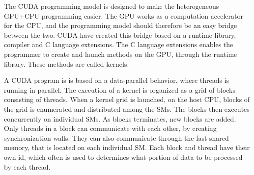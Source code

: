 The CUDA programming model is designed to make the heterogeneous GPU+CPU programming easier. The GPU works as a computation accelerator for the CPU, and the programming model should therefore be an easy bridge between the two. CUDA have created this bridge based on a runtime library, compiler and C language extensions. The C language extensions enables the programmer to create and launch methods on the GPU, through the runtime library. These methods are called kernels.

A CUDA program is is based on a data-parallel behavior, where threads is running in parallel. The execution of a kernel is organized as a grid of blocks consisting of threads. When a kernel grid is launched, on the host CPU, blocks of the grid is enumerated and distributed among the SMs. The blocks then executes concurrently on individual SMs. As blocks terminates, new blocks are added. Only threads in a block can communicate with each other, by creating synchronization walls. They can also communicate through the fast shared memory, that is located on each individual SM. Each block and thread have their own id, which often is used to determines what portion of data to be processed by each thread.

